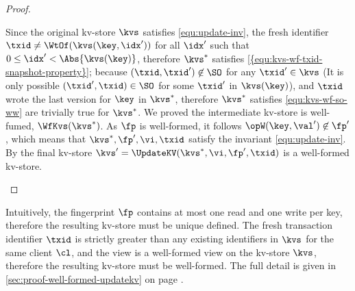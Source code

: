\begin{proof}
\begin{enumerate}
\begin{enumerate}
        Since the original kv-store \( \kvs \) satisfies \cref{equ:update-inv},
        the fresh identifier \( \txid \neq \WtOf(\kvs(\key,\idx'))\)
        for all \( \idx' \) such that \( 0 \leq \idx' < \Abs{\kvs(\key)} \),
        therefore \( \kvs^*\) satisfies \cref{{equ:kvs-wf-txid-snapshot-property}}; 
        because \( (\txid, \txid') \not\in \SO \) for any \( \txid' \in \kvs \) 
        (It is only possible \( (\txid', \txid) \in \SO \) for some \( \txid' \) in \(\kvs(\key) \)), 
        and \( \txid \) wrote the last version for \( \key \) in \( \kvs^*\),
        therefore \( \kvs^* \) satisfies \cref{equ:kvs-wf-so-ww}
         are trivially true for \( \kvs^* \).
        We proved the intermediate kv-store is well-fumed, \( \WfKvs(\kvs^*) \).
        As \( \fp \) is well-formed, it follows \( \opW(\key,\val') \not\in \fp' \),
        which means that \( \kvs^*, \fp',\vi,\txid \) satisfy the invariant \cref{equ:update-inv}.
        By \ih the final kv-store \( \kvs' = \UpdateKV(\kvs^*,\vi,\fp',\txid)\) is a well-formed kv-store. \qedhere
    \end{enumerate}
\end{enumerate}
\end{proof}
\begin{proofsketch}
Intuitively, the fingerprint \( \fp \) contains at most one read and one write per key,
therefore the resulting kv-store must be unique defined.
The fresh transaction identifier \( \txid \) is strictly greater than any existing
identifiers in \( \kvs \) for the same client \( \cl \),
and the view is a well-formed view on the kv-store \( \kvs \),
therefore the resulting kv-store must be well-formed.
The full detail is given in \cref{sec:proof-well-formed-updatekv} on page \pageref{sec:proof-well-formed-updatekv}.
\end{proofsketch}
